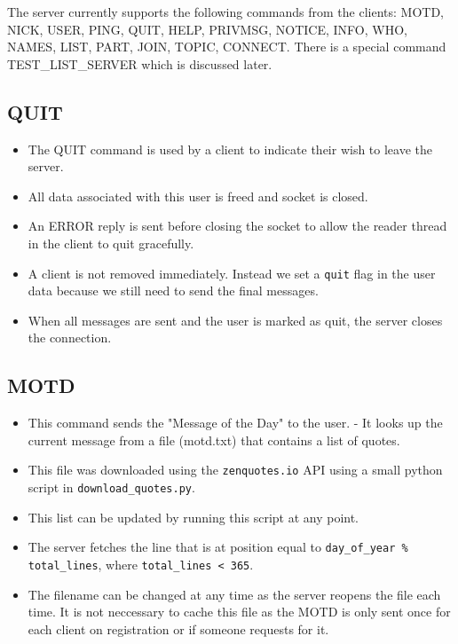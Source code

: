 \documentclass[letterpaper,twocolumn,10pt]{article}
\begin{document}
The server currently supports the following commands from the clients: MOTD,
NICK, USER, PING, QUIT, HELP, PRIVMSG, NOTICE, INFO, WHO, NAMES, LIST, PART,
JOIN, TOPIC, CONNECT. There is a special command TEST\_LIST\_SERVER which is
discussed later.

\subsection{QUIT}

\begin{itemize}

	\item The QUIT command is used by a client to indicate their wish to leave
	      the server.
	\item All data associated with this user is freed and socket is closed.
	\item An ERROR reply is sent before closing the socket to allow the reader
	      thread in the client to quit gracefully.
	\item A client is not removed immediately. Instead we set a \verb|quit|
	      flag in the user data because we still need to send the final messages.

	\item When all messages are sent and the user is marked as quit, the server
	      closes the connection.

\end{itemize}

\subsection{MOTD}

\begin{itemize}

	\item This command sends the "Message of the Day" to the user. - It looks
	      up the current message from a file (motd.txt) that contains a list of
	      quotes.
	\item This file was downloaded using the \verb|zenquotes.io| API using a
	      small python script in \verb|download_quotes.py|.
	\item This list can be updated by running this script at any point.
	\item The server fetches the line that is at position equal to
	      \verb|day_of_year % total_lines|, where \verb|total_lines < 365|.
	\item The filename can be changed at any time as the server reopens the
	      file each time. It is not neccessary to cache this file as the MOTD is
	      only sent once for each client on registration or if someone requests
	      for it.

\end{itemize}
\end{document}

